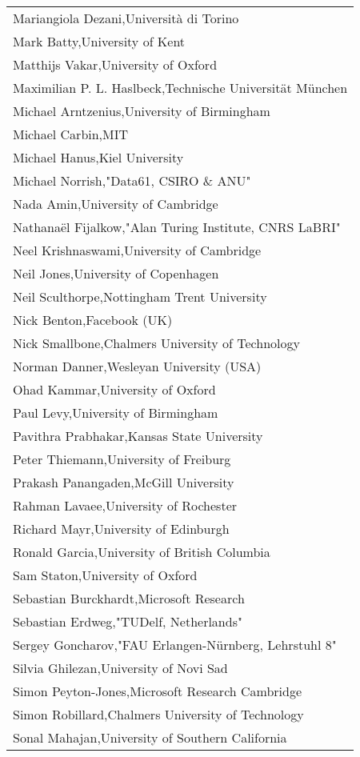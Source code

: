 \begin{tabular}[t]{@{}p{\namewidth}}
Mariangiola Dezani,Università di Torino\\
Mark Batty,University of Kent\\
Matthijs Vakar,University of Oxford\\
Maximilian P. L. Haslbeck,Technische Universität München\\
Michael Arntzenius,University of Birmingham\\
Michael Carbin,MIT\\
Michael Hanus,Kiel University\\
Michael Norrish,"Data61, CSIRO \& ANU"\\
Nada Amin,University of Cambridge\\
Nathanaël Fijalkow,"Alan Turing Institute, CNRS LaBRI"\\
Neel Krishnaswami,University of Cambridge\\
Neil Jones,University of Copenhagen\\
Neil Sculthorpe,Nottingham Trent University\\
Nick Benton,Facebook (UK)\\
Nick Smallbone,Chalmers University of Technology\\
Norman Danner,Wesleyan University (USA)\\
Ohad Kammar,University of Oxford\\
Paul Levy,University of Birmingham\\
Pavithra Prabhakar,Kansas State University\\
Peter Thiemann,University of Freiburg\\
Prakash Panangaden,McGill University\\
Rahman Lavaee,University of Rochester\\
Richard Mayr,University of Edinburgh\\
Ronald Garcia,University of British Columbia\\
Sam Staton,University of Oxford\\
Sebastian Burckhardt,Microsoft Research\\
Sebastian Erdweg,"TUDelf, Netherlands"\\
Sergey Goncharov,"FAU Erlangen-Nürnberg, Lehrstuhl 8"\\
Silvia Ghilezan,University of Novi Sad\\
Simon Peyton-Jones,Microsoft Research Cambridge\\
Simon Robillard,Chalmers University of Technology\\
Sonal Mahajan,University of Southern California\\

\end{tabular}
